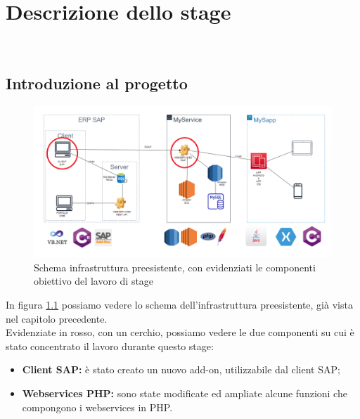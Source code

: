 
\chapter{Descrizione dello stage}
\label{cap:descrizione-stage}

\\

\section{Introduzione al progetto}
\begin{figure}[!h] 
	\centering 
	\includegraphics[scale = 0.5]{immagini/obiettivi-stage.png} 
	\caption{Schema infrastruttura preesistente, con evidenziati le componenti obiettivo del lavoro di stage}
	\label{fig:3-1}
\end{figure}
\newpage
\begin{flushleft}
	In figura \ref{fig:3-1} possiamo vedere lo schema dell'infrastruttura preesistente, già vista nel capitolo precedente.\\
	Evidenziate in rosso, con un cerchio, possiamo vedere le due componenti su cui è stato concentrato il lavoro durante questo stage:
\end{flushleft}

\begin{itemize}
	\item \textbf{Client SAP:} è stato creato un nuovo add-on, utilizzabile dal client SAP;
	\item \textbf{Webservices PHP:} sono state modificate ed ampliate alcune funzioni che compongono i webservices in PHP.
\end{itemize}
